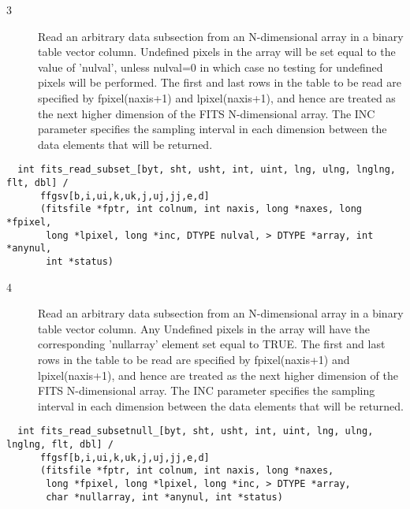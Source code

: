\documentclass[11pt]{book}
\begin{document}
\begin{description}
\item[3 ] Read an arbitrary data subsection from an N-dimensional array
    in a binary table vector column.  Undefined pixels
    in the array will be set equal to the value of 'nulval',
    unless nulval=0 in which case no testing for undefined pixels will
    be performed.  The first and last rows in the table to be read
    are specified by fpixel(naxis+1) and lpixel(naxis+1), and hence
    are treated as the next higher dimension of the FITS N-dimensional
    array.  The INC parameter specifies the sampling interval in
   each dimension between the data elements that will be returned. \label{ffgsvx2}
\end{description}

\begin{verbatim}
  int fits_read_subset_[byt, sht, usht, int, uint, lng, ulng, lnglng, flt, dbl] /
      ffgsv[b,i,ui,k,uk,j,uj,jj,e,d]
      (fitsfile *fptr, int colnum, int naxis, long *naxes, long *fpixel,
       long *lpixel, long *inc, DTYPE nulval, > DTYPE *array, int *anynul,
       int *status)
\end{verbatim}

\begin{description}
\item[4 ] Read an arbitrary data subsection from an N-dimensional array
    in a binary table vector column.  Any Undefined
    pixels in the array will have the corresponding 'nullarray'
    element set equal to TRUE.  The first and last rows in the table
    to be read are specified by fpixel(naxis+1) and lpixel(naxis+1),
    and hence are treated as the next higher dimension of the FITS
    N-dimensional array.  The INC parameter specifies the sampling
    interval in each dimension between the data elements that will be
   returned. \label{ffgsfx2}
\end{description}

\begin{verbatim}
  int fits_read_subsetnull_[byt, sht, usht, int, uint, lng, ulng, lnglng, flt, dbl] /
      ffgsf[b,i,ui,k,uk,j,uj,jj,e,d]
      (fitsfile *fptr, int colnum, int naxis, long *naxes,
       long *fpixel, long *lpixel, long *inc, > DTYPE *array,
       char *nullarray, int *anynul, int *status)
\end{verbatim}
\end{document}
